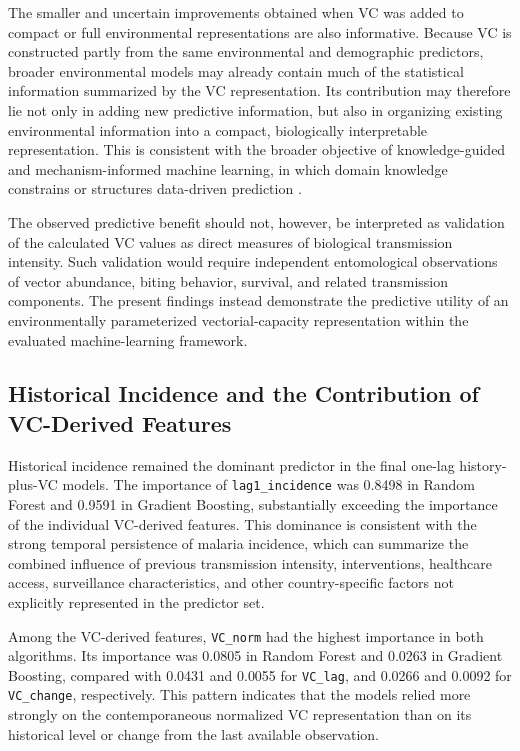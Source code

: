 \documentclass[10pt,twocolumn]{article}
\begin{document}
The smaller and uncertain improvements obtained when VC was added to
compact or full environmental representations are also informative.
Because VC is constructed partly from the same environmental and
demographic predictors, broader environmental models may already
contain much of the statistical information summarized by the VC
representation. Its contribution may therefore lie not only in adding
new predictive information, but also in organizing existing
environmental information into a compact, biologically interpretable
representation. This is consistent with the broader objective of
knowledge-guided and mechanism-informed machine learning, in which
domain knowledge constrains or structures data-driven prediction
\parencite{Yin2019,Wang2020,Karpatne2024}.

The observed predictive benefit should not, however, be interpreted as
validation of the calculated VC values as direct measures of biological
transmission intensity. Such validation would require independent
entomological observations of vector abundance, biting behavior,
survival, and related transmission components. The present findings
instead demonstrate the predictive utility of an environmentally
parameterized vectorial-capacity representation within the evaluated
machine-learning framework.


\subsection{Historical Incidence and the Contribution of VC-Derived Features}

Historical incidence remained the dominant predictor in the final
one-lag history-plus-VC models. The importance of
\texttt{lag1\_incidence} was 0.8498 in Random Forest and 0.9591 in
Gradient Boosting, substantially exceeding the importance of the
individual VC-derived features. This dominance is consistent with the
strong temporal persistence of malaria incidence, which can summarize
the combined influence of previous transmission intensity,
interventions, healthcare access, surveillance characteristics, and
other country-specific factors not explicitly represented in the
predictor set.

Among the VC-derived features, \texttt{VC\_norm} had the highest
importance in both algorithms. Its importance was 0.0805 in Random
Forest and 0.0263 in Gradient Boosting, compared with 0.0431 and
0.0055 for \texttt{VC\_lag}, and 0.0266 and 0.0092 for
\texttt{VC\_change}, respectively. This pattern indicates that the
models relied more strongly on the contemporaneous normalized VC
representation than on its historical level or change from the last
available observation.
\end{document}
